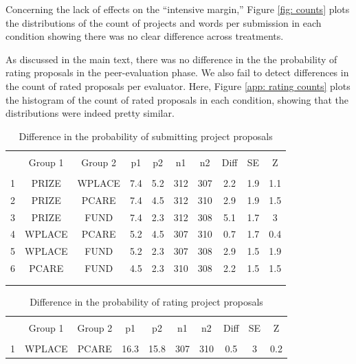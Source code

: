 \documentclass[12pt, titlepage]{article}
\begin{document}
Concerning the lack of effects on the ``intensive margin,'' Figure
\ref{fig: counts} plots the distributions of the count of projects and
words per submission in each condition showing there was no clear
difference across treatments.

As discussed in the main text, there was no difference in the the
probability of rating proposals in the peer-evaluation phase. We also
fail to detect differences in the count of rated proposals per
evaluator. Here, Figure \ref{app: rating counts} plots the histogram of
the count of rated proposals in each condition, showing that the
distributions were indeed pretty similar.

\begin{table}
\centering
\caption{Difference in the probability of submitting project proposals}
\label{app: proposals}
\begin{tabular}{@{}lccccccccc}
  \\[-1.8ex]\hline \hline \\[-1.8ex]
 & Group 1 & Group 2 & p1 & p2 & n1 & n2 & Diff & SE & Z \\ 
  \hline \\[-1.86ex]
1 & PRIZE & WPLACE & 7.4 & 5.2 & 312 & 307 & 2.2 & 1.9 & 1.1 \\ 
  2 & PRIZE & PCARE & 7.4 & 4.5 & 312 & 310 & 2.9 & 1.9 & 1.5 \\ 
  3 & PRIZE & FUND & 7.4 & 2.3 & 312 & 308 & 5.1 & 1.7 & 3 \\ 
  4 & WPLACE & PCARE & 5.2 & 4.5 & 307 & 310 & 0.7 & 1.7 & 0.4 \\ 
  5 & WPLACE & FUND & 5.2 & 2.3 & 307 & 308 & 2.9 & 1.5 & 1.9 \\ 
  6 & PCARE & FUND & 4.5 & 2.3 & 310 & 308 & 2.2 & 1.5 & 1.5 \\ 
   \\[-1.8ex]\hline \hline \\[-1.8ex]
\end{tabular}
\end{table}\begin{table}
\centering
\caption{Difference in the probability of rating project proposals}
\label{app: ratings}
\begin{tabular}{@{}lccccccccc}
  \\[-1.8ex]\hline \hline \\[-1.8ex]
 & Group 1 & Group 2 & p1 & p2 & n1 & n2 & Diff & SE & Z \\ 
  \hline \\[-1.86ex]
1 & WPLACE & PCARE & 16.3 & 15.8 & 307 & 310 & 0.5 & 3 & 0.2 \\ 

\end{tabular}
\end{table}
\end{document}
